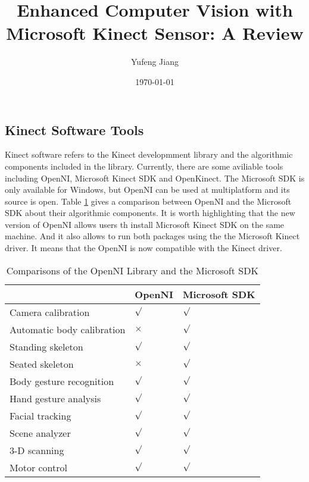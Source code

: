 \documentclass[a4paper]{article}
\title{Enhanced Computer Vision with Microsoft Kinect Sensor: A Review}
\author{Yufeng Jiang}
\date{\today}
\begin{document}
\maketitle
\balance
\begin{multicols}{2}
\section{Kinect Software Tools}
Kinect software refers to the Kinect developmment library and the algorithmic components included in the library. Currently, there are some aviliable tools including OpenNI, Microsoft Kinect SDK and OpenKinect. The Microsoft SDK is only available for Windows, but OpenNI can be used at multiplatform and its source is open. Table \ref{tab} gives a comparison between OpenNI and the Microsoft SDK about their algorithmic components. It is worth highlighting that the new version of OpenNI allows users th install Microsoft Kinect SDK on the same machine. And it also allows to run both packages using the the Microsoft Kinect driver. It means that the OpenNI is now compatible with the Kinect driver.\\
\begin{table}[H]
\centering
\caption{Comparisons of the OpenNI Library and the Microsoft SDK}
\label{tab}
\begin{tabular}{p{6em}p{3em}p{4em}}
  \hline
    & OpenNI & Microsoft SDK \\ \hline
  Camera calibration & $\surd$ & $\surd$ \\ \hline
  Automatic body calibration & $\times$ & $\surd$ \\ \hline
  Standing skeleton & $\surd$ & $\surd$ \\ \hline
  Seated skeleton & $\times$ & $\surd$  \\ \hline
  Body gesture recognition & $\surd$ & $\surd$ \\ \hline
  Hand gesture analysis & $\surd$ & $\surd$ \\ \hline
  Facial tracking & $\surd$ & $\surd$ \\ \hline
  Scene analyzer & $\surd$ & $\surd$ \\ \hline
  3-D scanning & $\surd$ & $\surd$ \\ \hline
  Motor control & $\surd$ & $\surd$ \\ \hline
\end{tabular}
\end{table}
\end{multicols}
\end{document}
